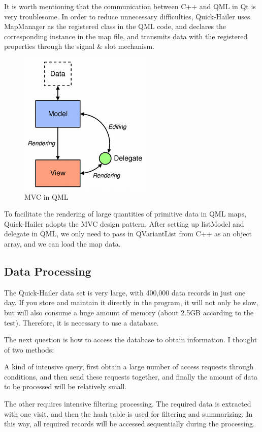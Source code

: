 \documentclass{article}
\begin{document}
It is worth mentioning that the communication between C++ and QML in Qt is very troublesome. In order to reduce unnecessary difficulties, Quick-Hailer uses MapManager as the registered class in the QML code, and declares the corresponding instance in the map file, and transmits data with the registered properties through the signal \& slot mechanism.

\setlength{\parindent}{0em}
\begin{figure}[htbp] 
	\centering 
	\includegraphics[scale=0.4]{modelview.png}
	\caption{MVC in QML}
\end{figure}
\setlength{\parindent}{2em}

To facilitate the rendering of large quantities of primitive data in QML maps, Quick-Hailer adopts the MVC design pattern. After setting up listModel and delegate in QML, we only need to pass in QVariantList from C++ as an object array, and we can load the map data.
\subsection{Data Processing}
The Quick-Hailer data set is very large, with 400,000 data records in just one day. If you store and maintain it directly in the program, it will not only be slow, but will also consume a huge amount of memory (about 2.5GB according to the test). Therefore, it is necessary to use a database.

The next question is how to access the database to obtain information. I thought of two methods:

A kind of intensive query, first obtain a large number of access requests through conditions, and then send these requests together, and finally the amount of data to be processed will be relatively small.

The other requires intensive filtering processing. The required data is extracted with one visit, and then the hash table is used for filtering and summarizing. In this way, all required records will be accessed sequentially during the processing.
\end{document}
